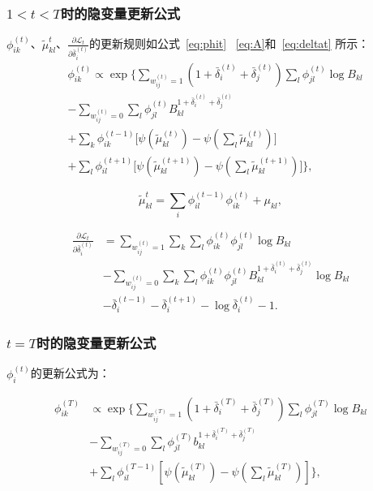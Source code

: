 \subsubsection{$1<t<T$时的隐变量更新公式}
$\phi_{ik}^{(t)}$、$\tilde{\mu}_{kl}^t$、$\frac{\partial \mathscr{L}_t}{\partial \bar{\delta}_i^{(t)}}$的更新规则如公式~\ref{eq:phit} ~\ref{eq:A}和~\ref{eq:deltat} 所示：
   \begin{equation}
   \begin{split}
   &\phi_{ik}^{(t)} \propto \exp\bigg\{ \sum_{w_{ij}^{(t)}=1} (1+\bar{\delta}_i^{(t)}+\bar{\delta}_j^{(t)}) \sum_l \phi_{jl}^{(t)} \log B_{kl} \\
   & -\sum_{w_{ij}^{(t)}=0} \sum_l \phi_{jl}^{(t)}  B_{kl}^{1+\bar{\delta}_i^{(t)}+\bar{\delta}_j^{(t)}}  \\
  & +\sum_k \phi_{ik}^{(t-1)} \Big[\psi(\tilde{\mu}_{kl}^{(t)}) - \psi(\sum_l \tilde{\mu}_{kl}^{(t)})\Big] \\
   &+ \sum_l \phi_{il}^{(t+1)} \Big[\psi(\tilde{\mu}_{kl}^{(t+1)}) - \psi(\sum_l \tilde{\mu}_{kl}^{(t+1)})\Big] \bigg\},
   \label{eq:phit}
   \end{split}
   \end{equation}

   \begin{equation}
   \tilde{\mu}_{kl}^t = \sum_i \phi_{il}^{(t-1)} \phi_{ik}^{(t)} + \mu_{kl},
   \label{eq:A}
   \end{equation}


\begin{align}
\frac{\partial \mathscr{L}_t}{\partial \bar{\delta}_i^{(t)}} & =\sum_{w_{ij}^{(t)}=1} \sum_k \sum_l \phi_{ik}^{(t)}\phi_{jl}^{(t)} \log B_{kl}  \nonumber\\
& -\sum_{w_{ij}^{(t)}=0} \sum_k \sum_l \phi_{ik}^{(t)}\phi_{jl}^{(t)}  B_{kl}^{1+\bar{\delta}_i^{(t)}+\bar{\delta}_j^{(t)}} \log B_{kl} \nonumber\\
& -\bar{\delta}_i^{(t-1)} - \bar{\delta}_i^{(t+1)} - \log \bar{\delta}_i^{(t)} - 1.
\label{eq:deltat}
\end{align}



\subsubsection{$t=T$时的隐变量更新公式}

$\phi_i^{(t)}$的更新公式为：


\begin{equation}
\begin{split}
\phi_{ik}^{(T)} & \propto \exp\{ \sum_{w_{ij}^{(T)}=1} (1+\bar{\delta}_i^{(T)}+\bar{\delta}_j^{(T)}) \sum_l \phi_{jl}^{(T)} \log B_{kl} \\
& -\sum_{w_{ij}^{(T)}=0} \sum_l \phi_{jl}^{(T)}  b_{kl}^{1+\bar{\delta}_i^{(T)}+\bar{\delta}_j^{(T)}}  \\
& + \sum_l \phi_{il}^{(T-1)} [\psi(\tilde{\mu}_{kl}^{(T)}) - \psi(\sum_l \tilde{\mu}_{kl}^{(T)})] \},
\end{split}
\label{eq:phiT}
\end{equation}

